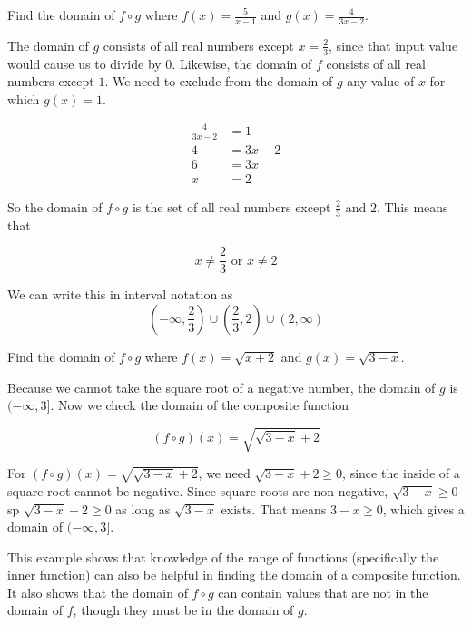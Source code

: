 \documentclass{ximera}
\begin{document}
\begin{example}
Find the domain of $f \circ g$ where $f(x)=\frac{5}{x-1}$  and $g(x)=\frac{4}{3x-2}$.

\begin{explanation}
The domain of $g$ consists of all real numbers except $x=\frac{2}{3}$, since that input value would cause us to divide by 0. Likewise, the domain of $f$ consists of all real numbers except $1$. We need to exclude from the domain of $g$ any value of $x$ for which $g(x)=1$.


\begin{align*}
\frac{4}{3x-2} &=1\\
4 &=3x-2\\
6 &=3x\\
x &=2
\end{align*}

So the domain of $f \circ g$ is the set of all real numbers except $\frac{2}{3}$ and $2$. This means that

\[
x \neq \frac{2}{3} \text{ or } x \neq 2
\]

We can write this in interval notation as
\[
\left(-\infty,\frac{2}{3}\right) \cup \left(\frac{2}{3},2\right) \cup \left(2,\infty\right)
\]

\end{explanation}
\end{example}




\begin{example}
Find the domain of $f \circ g$ where $f(x)=\sqrt{x+2}$ and $g(x)=\sqrt{3-x}$.

\begin{explanation}

Because we cannot take the square root of a negative number, the domain of $g$ is $(-\infty,3]$. Now we check the domain of the composite function

\[
(f \circ g)(x)=\sqrt{\sqrt{3-x}+2}
\]

For $(f \circ g)(x)=\sqrt{\sqrt{3-x}+2}$, we need $\sqrt{3-x}+2 \geq 0$, since the inside of a square root cannot be negative. Since square roots are non-negative, $\sqrt{3-x} \geq 0$ sp $\sqrt{3-x}+2 \geq 0$ as long as $\sqrt{3-x}$ exists. That means $3-x \geq 0$, which gives a domain of $(- \infty,3]$.

\end{explanation}

\end{example}

This example shows that knowledge of the range of functions (specifically the inner function) can also be helpful in finding the domain of a composite function. It also shows that the domain of $f \circ g$ can contain values that are not in the domain of $f$, though they must be in the domain of $g$.
\end{document}
